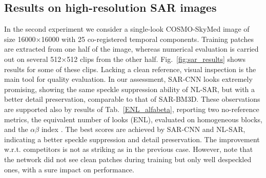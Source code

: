 \documentclass{article}
\begin{document}
\subsection{Results on high-resolution SAR images}

In the second experiment we consider a single-look COSMO-SkyMed image of size 16000$\times$16000 with 25 co-registered temporal components.
Training patches are extracted from one half of the image, whereas numerical evaluation is carried out on several 512$\times$512 clips from the other half.
Fig.~\ref{fig:sar_results} shows results for some of these clips.
Lacking a clean reference, visual inspection is the main tool for quality evaluation.
In our assessment, SAR-CNN looks extremely promising, showing the same speckle suppression ability of NL-SAR, but with a better detail preservation, comparable to that of SAR-BM3D.
These observations are supported also by results of Tab.~\ref{ENL_alfabeta}, reporting two no-reference metrics, the equivalent number of looks (ENL), evaluated on homogeneous blocks,
and the $\alpha\beta$ index \cite{Gomez2016}.
The best scores are achieved by SAR-CNN and NL-SAR, indicating a better speckle suppression and detail preservation.
The improvement w.r.t. competitors is not as striking as in the previous case.
However, note that the network did not see clean patches during training
but only well despeckled ones, with a sure impact on performance.
\end{document}
